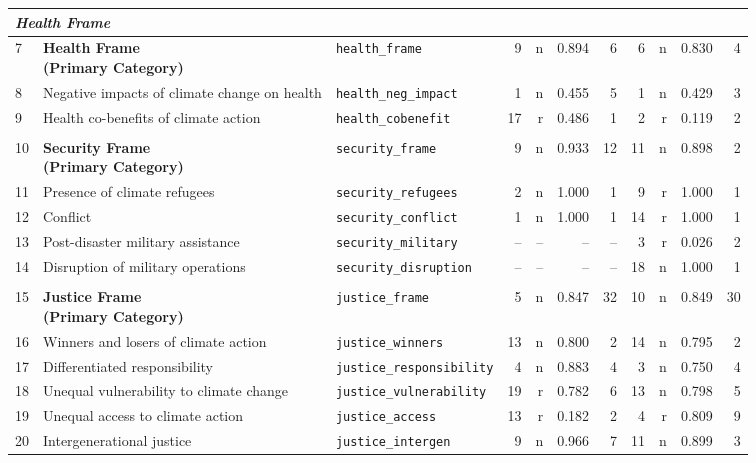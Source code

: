 \begin{longtable}{p{0.5cm}p{4.0cm}p{3.0cm}rrrrrrrr}
\multicolumn{11}{l}{\textit{Health Frame}} \\
\midrule
7 & \textbf{Health Frame\newline (Primary Category)} & \texttt{health\_frame} & 9 & n & 0.894 & 6 & 6 & n & 0.830 & 4 \\
\cmidrule(lr){1-11}
8 & Negative impacts of climate change on health & \texttt{health\_neg\_impact} & 1 & n & 0.455 & 5 & 1 & n & 0.429 & 3 \\
9 & Health co-benefits of climate action & \texttt{health\_cobenefit} & 17 & r & 0.486 & 1 & 2 & r & 0.119 & 2 \\
\midrule
\rowcolor{gray!8}
\multicolumn{11}{l}{\textit{Security Frame}} \\
\midrule
10 & \textbf{Security Frame\newline (Primary Category)} & \texttt{security\_frame} & 9 & n & 0.933 & 12 & 11 & n & 0.898 & 2 \\
\cmidrule(lr){1-11}
11 & Presence of climate refugees & \texttt{security\_refugees} & 2 & n & 1.000 & 1 & 9 & r & 1.000 & 1 \\
12 & Conflict & \texttt{security\_conflict} & 1 & n & 1.000 & 1 & 14 & r & 1.000 & 1 \\
13 & Post-disaster military assistance & \texttt{security\_military} & -- & -- & -- & -- & 3 & r & 0.026 & 2 \\
14 & Disruption of military operations & \texttt{security\_disruption} & -- & -- & -- & -- & 18 & n & 1.000 & 1 \\
\midrule
\rowcolor{gray!8}
\multicolumn{11}{l}{\textit{Justice Frame}} \\
\midrule
15 & \textbf{Justice Frame\newline (Primary Category)} & \texttt{justice\_frame} & 5 & n & 0.847 & 32 & 10 & n & 0.849 & 30 \\
\cmidrule(lr){1-11}
16 & Winners and losers of climate action & \texttt{justice\_winners} & 13 & n & 0.800 & 2 & 14 & n & 0.795 & 2 \\
17 & Differentiated responsibility & \texttt{justice\_responsibility} & 4 & n & 0.883 & 4 & 3 & n & 0.750 & 4 \\
18 & Unequal vulnerability to climate change & \texttt{justice\_vulnerability} & 19 & r & 0.782 & 6 & 13 & n & 0.798 & 5 \\
19 & Unequal access to climate action & \texttt{justice\_access} & 13 & r & 0.182 & 2 & 4 & r & 0.809 & 9 \\
20 & Intergenerational justice & \texttt{justice\_intergen} & 9 & n & 0.966 & 7 & 11 & n & 0.899 & 3 \\

\end{longtable}
